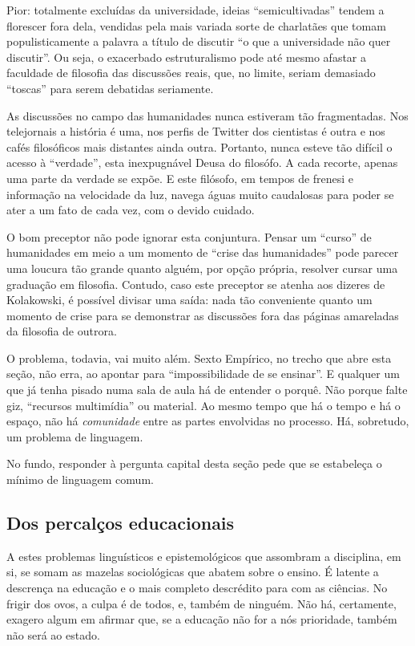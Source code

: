 \documentclass[12pt,a4paper]{article}
\begin{document}
	Pior: totalmente excluídas da universidade, ideias “semicultivadas”
	tendem a florescer fora dela, vendidas pela mais variada sorte de 
	charlatães que tomam populisticamente a palavra a título de discutir 
	“o que a universidade não quer discutir”. Ou seja, o exacerbado 
	estruturalismo pode até mesmo afastar a faculdade de filosofia das 
	discussões reais, que, no limite, seriam demasiado “toscas” para serem 
	debatidas seriamente. 

	As discussões no campo das humanidades nunca estiveram tão 
	fragmentadas. Nos telejornais a história é uma, nos perfis de Twitter 
	dos cientistas é outra e nos cafés filosóficos mais distantes ainda 
	outra. Portanto, nunca esteve tão difícil o acesso à “verdade”, esta 
	inexpugnável Deusa do filosófo. A cada recorte, apenas uma parte da 
	verdade se expõe. E este filósofo, em tempos de frenesi e informação 
	na velocidade da luz, navega águas muito caudalosas para poder se 
	ater a um fato de cada vez, com o devido cuidado. 

	O bom preceptor não pode ignorar esta conjuntura. Pensar um “curso” 
	de humanidades em meio a um momento de “crise das humanidades” pode 
	parecer uma loucura tão grande quanto alguém, por opção própria, 
	resolver cursar uma graduação em filosofia. Contudo, caso este 
	preceptor se atenha aos dizeres de Kolakowski, é possível divisar 
	uma saída: nada tão conveniente quanto um momento de 
	crise para se demonstrar as discussões fora das páginas amareladas 
	da filosofia de outrora. 

	O problema, todavia, vai muito além. Sexto Empírico, no trecho que 
	abre esta seção, não erra, ao apontar para “impossibilidade de se 
	ensinar”. E qualquer um que já tenha pisado numa sala de aula há de 
	entender o porquê. Não porque falte giz, “recursos multimídia” ou 
	material. Ao mesmo tempo que há o tempo e há o espaço, não há 
	\textit{comunidade} entre as partes envolvidas no processo. Há, 
	sobretudo, um problema de linguagem. 

	No fundo, responder à pergunta capital desta seção pede que se 
	estabeleça o mínimo de linguagem comum. 

	\subsection*{Dos percalços educacionais}

	A estes problemas linguísticos e epistemológicos que assombram 
	a disciplina, em si, se somam as mazelas sociológicas que abatem 
	sobre o ensino. É latente a descrença na educação e o mais completo 
	descrédito para com as ciências. No frigir dos ovos, a culpa é de 
	todos, e, também de ninguém. Não há, certamente, exagero algum em 
	afirmar que, se a educação não for a nós prioridade, também não 
	será ao estado. 
\end{document}
